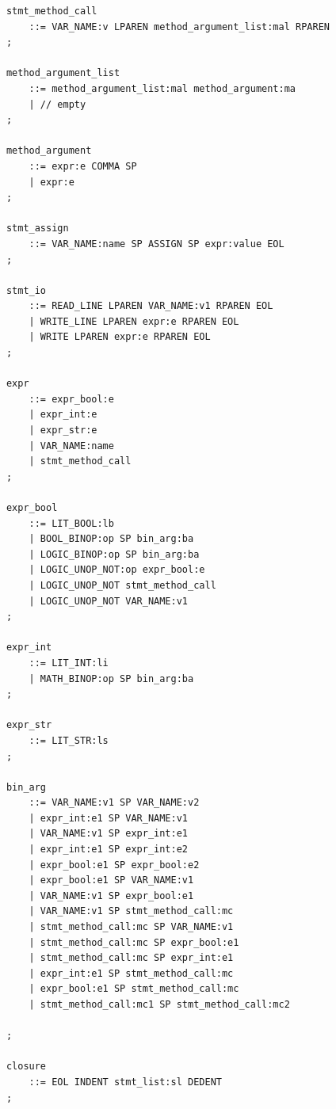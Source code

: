 \documentclass{article}
\begin{document}
\begin{lstlisting}
            stmt_method_call
            	::= VAR_NAME:v LPAREN method_argument_list:mal RPAREN
            ;
            
            method_argument_list
            	::= method_argument_list:mal method_argument:ma
            	| // empty
            ;
            
            method_argument
            	::= expr:e COMMA SP
            	| expr:e
            ;
            
            stmt_assign
            	::= VAR_NAME:name SP ASSIGN SP expr:value EOL
            ;
            
            stmt_io
            	::= READ_LINE LPAREN VAR_NAME:v1 RPAREN EOL
            	| WRITE_LINE LPAREN expr:e RPAREN EOL
            	| WRITE LPAREN expr:e RPAREN EOL
            ;
            
            expr
            	::= expr_bool:e
            	| expr_int:e
            	| expr_str:e
            	| VAR_NAME:name
            	| stmt_method_call
            ;
            
            expr_bool
            	::= LIT_BOOL:lb
            	| BOOL_BINOP:op SP bin_arg:ba
            	| LOGIC_BINOP:op SP bin_arg:ba
            	| LOGIC_UNOP_NOT:op expr_bool:e
            	| LOGIC_UNOP_NOT stmt_method_call
            	| LOGIC_UNOP_NOT VAR_NAME:v1
            ;
            
            expr_int
            	::= LIT_INT:li
            	| MATH_BINOP:op SP bin_arg:ba
            ;
            
            expr_str
            	::= LIT_STR:ls
            ;
            
            bin_arg
                ::= VAR_NAME:v1 SP VAR_NAME:v2
                | expr_int:e1 SP VAR_NAME:v1
                | VAR_NAME:v1 SP expr_int:e1
                | expr_int:e1 SP expr_int:e2
                | expr_bool:e1 SP expr_bool:e2
                | expr_bool:e1 SP VAR_NAME:v1
                | VAR_NAME:v1 SP expr_bool:e1
                | VAR_NAME:v1 SP stmt_method_call:mc	
                | stmt_method_call:mc SP VAR_NAME:v1
                | stmt_method_call:mc SP expr_bool:e1
                | stmt_method_call:mc SP expr_int:e1
                | expr_int:e1 SP stmt_method_call:mc
                | expr_bool:e1 SP stmt_method_call:mc
                | stmt_method_call:mc1 SP stmt_method_call:mc2
                    
            ;
            
            closure
            	::= EOL INDENT stmt_list:sl DEDENT
            ;
        \end{lstlisting}
\end{document}
